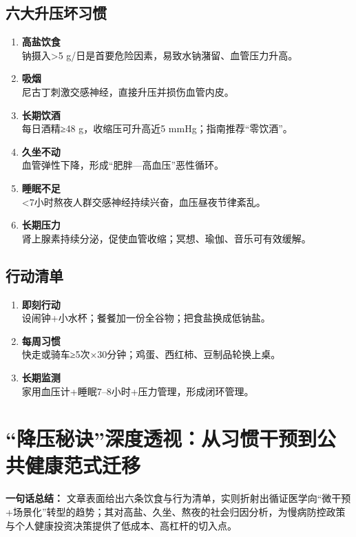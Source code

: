 \subsection{六大升压坏习惯}
\begin{enumerate}[leftmargin=*, nosep]
    \item \textbf{高盐饮食}  \\
    钠摄入>5 g/日是首要危险因素，易致水钠潴留、血管压力升高。
    \item \textbf{吸烟}  \\
    尼古丁刺激交感神经，直接升压并损伤血管内皮。
    \item \textbf{长期饮酒}  \\
    每日酒精≥48 g，收缩压可升高近5 mmHg；指南推荐“零饮酒”。
    \item \textbf{久坐不动}  \\
    血管弹性下降，形成“肥胖—高血压”恶性循环。
    \item \textbf{睡眠不足}  \\
    <7小时熬夜人群交感神经持续兴奋，血压昼夜节律紊乱。
    \item \textbf{长期压力}  \\
    肾上腺素持续分泌，促使血管收缩；冥想、瑜伽、音乐可有效缓解。
\end{enumerate}

\subsection{行动清单}
\begin{enumerate}[leftmargin=*, nosep]
    \item \textbf{即刻行动}  \\
    设闹钟+小水杯；餐餐加一份全谷物；把食盐换成低钠盐。
    \item \textbf{每周习惯}  \\
    快走或骑车≥5次×30分钟；鸡蛋、西红柿、豆制品轮换上桌。
    \item \textbf{长期监测}  \\
    家用血压计+睡眠7–8小时+压力管理，形成闭环管理。
\end{enumerate}


\section{“降压秘诀”深度透视：从习惯干预到公共健康范式迁移}
\textbf{一句话总结：}  
文章表面给出六条饮食与行为清单，实则折射出循证医学向“微干预+场景化”转型的趋势；其对高盐、久坐、熬夜的社会归因分析，为慢病防控政策与个人健康投资决策提供了低成本、高杠杆的切入点。


